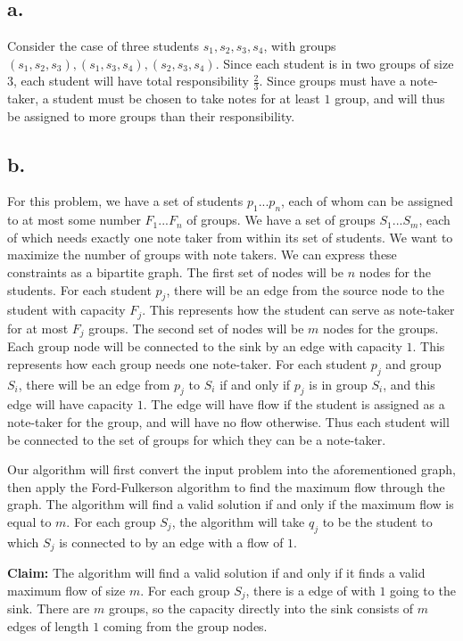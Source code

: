 \documentclass{article}
\begin{document}
\section{}
\subsection*{a.}
Consider the case of three students $s_1, s_2, s_3, s_4$, with groups $(s_1, s_2, s_3), (s_1, s_3, s_4), (s_2, s_3, s_4)$. Since each student is in two groups of size $3$, each student will have total responsibility $\frac{2}{3}$. Since groups must have a note-taker, a student must be chosen to take notes for at least $1$ group, and will thus be assigned to more groups than their responsibility.

\subsection*{b.}
For this problem, we have a set of students $p_1...p_n$, each of whom can be assigned to at most some number $F_1...F_n$ of groups. We have a set of groups $S_1...S_m$, each of which needs exactly one note taker from within its set of students. We want to maximize the number of groups with note takers. We can express these constraints as a bipartite graph. The first set of nodes will be $n$ nodes for the students. For each student $p_j$, there will be an edge from the source node to the student with capacity $F_j$. This represents how the student can serve as note-taker for at most $F_j$ groups. The second set of nodes will be $m$ nodes for the groups. Each group node will be connected to the sink by an edge with capacity $1$. This represents how each group needs one note-taker. For each student $p_j$ and group $S_i$, there will be an edge from $p_j$ to $S_i$ if and only if $p_j$ is in group $S_i$, and this edge will have capacity $1$. The edge will have flow if the student is assigned as a note-taker for the group, and will have no flow otherwise. Thus each student will be connected to the set of groups for which they can be a note-taker. 

Our algorithm will first convert the input problem into the aforementioned graph, then apply the Ford-Fulkerson algorithm to find the maximum flow through the graph. The algorithm will find a valid solution if and only if the maximum flow is equal to $m$. For each group $S_j$, the algorithm will take $q_j$ to be the student to which $S_j$ is connected to by an edge with a flow of $1$. 

\textbf{Claim:} The algorithm will find a valid solution if and only if it finds a valid maximum flow of size $m$.
For each group $S_j$, there is a edge of with $1$ going to the sink. There are $m$ groups, so the capacity directly into the sink consists of $m$ edges of length $1$ coming from the group nodes. 
\end{document}
